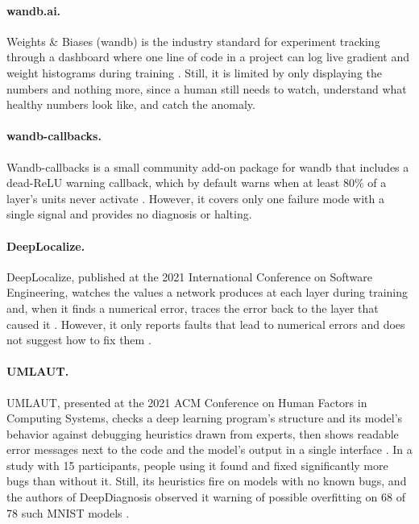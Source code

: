 \documentclass[11pt]{article}
\begin{document}
\paragraph{wandb.ai.} Weights \& Biases (wandb) is the industry standard for experiment tracking through a dashboard where one line of code in a project can log live gradient and weight histograms during training \citep{biewald2020}. Still, it is limited by only displaying the numbers and nothing more, since a human still needs to watch, understand what healthy numbers look like, and catch the anomaly.

\paragraph{wandb-callbacks.} Wandb-callbacks is a small community add-on package for wandb that includes a dead-ReLU warning callback, which by default warns when at least 80\% of a layer's units never activate \citep{groeger_wandbcallbacks}. However, it covers only one failure mode with a single signal and provides no diagnosis or halting.

\paragraph{DeepLocalize.} DeepLocalize, published at the 2021 International Conference on Software Engineering, watches the values a network produces at each layer during training and, when it finds a numerical error, traces the error back to the layer that caused it \citep{wardat2021}. However, it only reports faults that lead to numerical errors and does not suggest how to fix them \citep{wardat2022}.

\paragraph{UMLAUT.} UMLAUT, presented at the 2021 ACM Conference on Human Factors in Computing Systems, checks a deep learning program's structure and its model's behavior against debugging heuristics drawn from experts, then shows readable error messages next to the code and the model's output in a single interface \citep{schoop2021}. In a study with 15 participants, people using it found and fixed significantly more bugs than without it. Still, its heuristics fire on models with no known bugs, and the authors of DeepDiagnosis observed it warning of possible overfitting on 68 of 78 such MNIST models \citep{wardat2022}.
\end{document}
